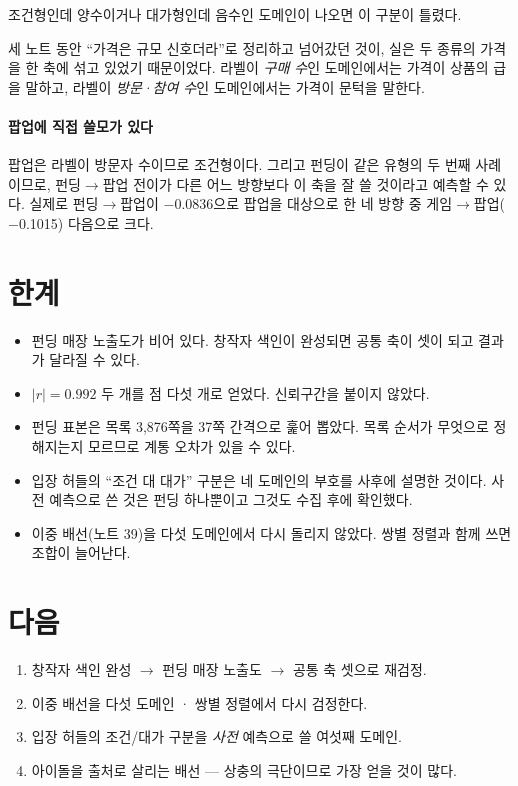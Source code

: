 \documentclass[10pt]{article}
\begin{document}
{조건형인데 양수이거나 대가형인데 음수인 도메인이 나오면 이 구분이 틀렸다.}

세 노트 동안 ``가격은 규모 신호더라''로 정리하고 넘어갔던 것이, 실은 두 종류의
가격을 한 축에 섞고 있었기 때문이었다. 라벨이 \emph{구매 수}인 도메인에서는
가격이 상품의 급을 말하고, 라벨이 \emph{방문·참여 수}인 도메인에서는 가격이
문턱을 말한다.

\paragraph{팝업에 직접 쓸모가 있다}
팝업은 라벨이 방문자 수이므로 조건형이다. 그리고 펀딩이 같은 유형의 두 번째
사례이므로, 펀딩$\to$팝업 전이가 다른 어느 방향보다 이 축을 잘 쓸 것이라고
예측할 수 있다. 실제로 펀딩$\to$팝업이 $-$0.0836으로 팝업을 대상으로 한 네
방향 중 게임$\to$팝업($-$0.1015) 다음으로 크다.

\section{한계}

\begin{itemize}[leftmargin=1.1em,itemsep=0.15em]
\item 펀딩 매장 노출도가 비어 있다. 창작자 색인이 완성되면 공통 축이 셋이 되고
      결과가 달라질 수 있다.
\item $|r|=0.992$ 두 개를 점 다섯 개로 얻었다. 신뢰구간을 붙이지 않았다.
\item 펀딩 표본은 목록 3,876쪽을 37쪽 간격으로 훑어 뽑았다. 목록 순서가
      무엇으로 정해지는지 모르므로 계통 오차가 있을 수 있다.
\item 입장 허들의 ``조건 대 대가'' 구분은 네 도메인의 부호를 사후에 설명한
      것이다. 사전 예측으로 쓴 것은 펀딩 하나뿐이고 그것도 수집 후에 확인했다.
\item 이중 배선(노트 39)을 다섯 도메인에서 다시 돌리지 않았다. 쌍별 정렬과
      함께 쓰면 조합이 늘어난다.
\end{itemize}

\section{다음}

\begin{enumerate}[leftmargin=1.3em,itemsep=0.15em]
\item 창작자 색인 완성 $\to$ 펀딩 매장 노출도 $\to$ 공통 축 셋으로 재검정.
\item 이중 배선을 다섯 도메인 · 쌍별 정렬에서 다시 검정한다.
\item 입장 허들의 조건/대가 구분을 \emph{사전} 예측으로 쓸 여섯째 도메인.
\item 아이돌을 출처로 살리는 배선 --- 상충의 극단이므로 가장 얻을 것이 많다.
\end{enumerate}
\end{document}
